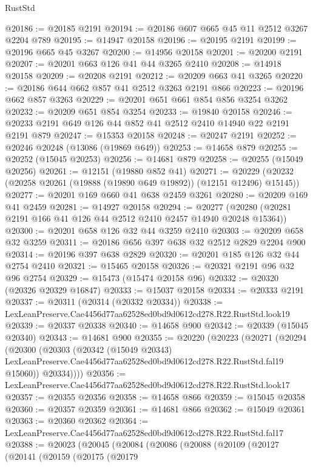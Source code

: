 \begin{lexlean}{RustStd}
\begin{coremodule}
@20186 := @20185 @2191
@20194 := @20186 @607 @665 @45 @11 @2512 @3267 @2204 @789
@20195 := @14947 @20158
@20196 := @20195 @2191
@20199 := @20196 @665 @45 @3267
@20200 := @14956 @20158
@20201 := @20200 @2191
@20207 := @20201 @663 @126 @41 @44 @3265 @2410
@20208 := @14918 @20158
@20209 := @20208 @2191
@20212 := @20209 @663 @41 @3265
@20220 := @20186 @644 @662 @857 @41 @2512 @3263 @2191 @866
@20223 := @20196 @662 @857 @3263
@20229 := @20201 @651 @661 @854 @856 @3254 @3262
@20232 := @20209 @651 @854 @3254
@20233 := @19840 @20158
@20246 := @20233 @2191 @649 @126 @44 @852 @41 @2512 @2410 @14940 @22 @2191 @2191 @879
@20247 := @15353 @20158
@20248 := @20247 @2191
@20252 := @20246 @20248 (@13086 (@19869 @649))
@20253 := @14658 @879
@20255 := @20252 (@15045 @20253)
@20256 := @14681 @879
@20258 := @20255 (@15049 @20256)
@20261 := @12151 (@19880 @852 @41)
@20271 := @20229 (@20232 (@20258 @20261 (@19888 (@19890 @649 @19892)) (@12151 @12496) @15145))
@20277 := @20201 @169 @660 @41 @638 @2459 @3261
@20280 := @20209 @169 @41 @2459
@20281 := @14927 @20158
@20294 := @20277 (@20280 (@20281 @2191 @166 @41 @126 @44 @2512 @2410 @2457 @14940 @20248 @15364))
@20300 := @20201 @658 @126 @32 @44 @3259 @2410
@20303 := @20209 @658 @32 @3259
@20311 := @20186 @656 @397 @638 @32 @2512 @2829 @2204 @900
@20314 := @20196 @397 @638 @2829
@20320 := @20201 @185 @126 @32 @44 @2754 @2410
@20321 := @15465 @20158
@20326 := @20321 @2191 @96 @32 @96 @2754
@20329 := @15473 (@15474 @20158 @96)
@20332 := @20320 (@20326 @20329 @16847)
@20333 := @15037 @20158
@20334 := @20333 @2191
@20337 := @20311 (@20314 (@20332 @20334))
@20338 := LexLeanPreserve.Cae4456d77aa62528ed0bd9d0612cd278.R22.RustStd.look19
@20339 := @20337 @20338
@20340 := @14658 @900
@20342 := @20339 (@15045 @20340)
@20343 := @14681 @900
@20355 := @20220
    (@20223
      (@20271
        (@20294
          (@20300
            (@20303
              (@20342
                (@15049 @20343)
                LexLeanPreserve.Cae4456d77aa62528ed0bd9d0612cd278.R22.RustStd.fal19
                @15060))
            @20334))))
@20356 := LexLeanPreserve.Cae4456d77aa62528ed0bd9d0612cd278.R22.RustStd.look17
@20357 := @20355 @20356
@20358 := @14658 @866
@20359 := @15045 @20358
@20360 := @20357 @20359
@20361 := @14681 @866
@20362 := @15049 @20361
@20363 := @20360 @20362
@20364 := LexLeanPreserve.Cae4456d77aa62528ed0bd9d0612cd278.R22.RustStd.fal17
@20388 := @20023
    (@20045
      (@20084
        (@20086
          (@20088
            (@20109
              (@20127
                (@20141
                  (@20159
                    (@20175
                      (@20179

\end{coremodule}
\end{lexlean}
